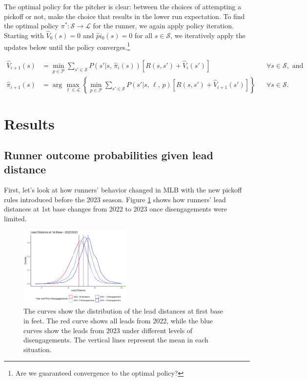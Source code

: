 \documentclass{article}
\begin{document}
        The optimal policy for the pitcher is clear: between the choices of attempting a pickoff or not, make the choice that results in the lower run expectation. To find the optimal policy $\pi^* : \mathcal{S} \rightarrow \mathcal{L}$ for the runner, we again apply policy iteration. Starting with $\hat V_0(s) = 0$ and $\hat pi_0(s) = 0$ for all $s \in \mathcal{S}$, we iteratively apply the updates below until the policy converges.\footnote{Are we guaranteed convergence to the optimal policy?}
        
        \begin{align}
          \label{eqn:update-value-two-agent}
          \hat V_{i+1}(s) &= \min_{p \in \mathcal{P}} \sum_{s' \in \mathcal{S}} P(s' | s,\, \hat\pi_i(s)) [R(s, s') + \hat V_i(s')] && \forall s \in \mathcal{S}, \mbox{ and}\\
          \label{eqn:update-policy-two-agent}
          \hat\pi_{i+1}(s) &= \arg\max_{\ell \in \mathcal{L}} \left\{\min_{p \in \mathcal{P}}\sum_{s' \in \mathcal{S}} P(s' | s,\, \ell,\, p) [R(s, s') + \hat V_{i+1}(s')]\right\} && \forall s \in \mathcal{S}.
        \end{align}

  \section{Results}
  
    \subsection{Runner outcome probabilities given lead distance}

    First, let's look at how runners' behavior changed in MLB with the new pickoff rules introduced before the 2023 season. Figure \ref{fig:leads-overall} shows how runners' lead distances at 1st base changes from 2022 to 2023 once disengagements were limited.

    \begin{figure}[b]
      \centering
      \includegraphics[width = 0.5\textwidth]{../../figures/leads_overall.png}
      \caption{The curves show the distribution of the lead distances at first base in feet. The red curve shows all leads from 2022, while the blue curves show the leads from 2023 under different levels of disengagements. The vertical lines represent the mean in each situation.}
      \label{fig:leads-overall}
    \end{figure}
\end{document}
